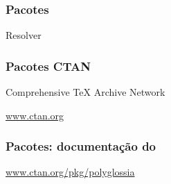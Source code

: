 \begin{frame}
  \frametitle{Pacotes}
  \huge
  Resolver 
\end{frame}

\begin{frame}
  \frametitle{Pacotes CTAN}
  \LARGE
  Comprehensive \TeX{} Archive Network

  \url{www.ctan.org}
\end{frame}

\begin{frame}
  \frametitle{Pacotes: documentação do }
  \LARGE
  \url{www.ctan.org/pkg/polyglossia}
\end{frame}
